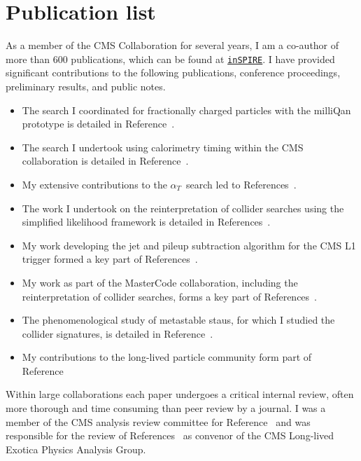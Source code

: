 \documentclass[11pt,a4paper]{article}
\theoremstyle{plain} \numberwithin{equation}{section}
\theoremstyle{definition}
\newcounter{list}
\begin{document}
\section*{Publication list}
As a member of the CMS Collaboration for several years, I am a co-author of more than 600 publications, which can be found at 
\href{http://inspirehep.net/author/profile/M.Citron.2}{\texttt{inSPIRE}}. I have provided significant
  contributions to the following publications, conference proceedings,
  preliminary results, and public notes.
  \begin{itemize}
  \item The search I coordinated for fractionally charged particles with the milliQan prototype is detailed in Reference~\cite{ball2020search}.
  \item The search I undertook using calorimetry timing within the CMS collaboration is detailed in Reference~\cite{2019134876}.
  \item My extensive contributions to the $\alpha_T$~search led to References~\cite{CMS:2016dbr,CMS:2015dbr}.
  \item The work I undertook on the reinterpretation of collider searches using the simplified likelihood framework is detailed in References~\cite{simplifiedLikelihood,Buckley_2019}.
  \item My work developing the jet and pileup subtraction algorithm for the CMS L1 trigger formed a key part of References~\cite{Zabi:2016ljo,Kreis:2015jjr}.
  \item My work as part of the MasterCode collaboration, including the reinterpretation of collider searches, forms a key part of References~\cite{Bagnaschi:2016afc,Bagnaschi:2015eha,Buchmueller:2014yva,Buchmueller:2012hv,deVries:2015hva,Buchmueller:2015uqa}.
  \item The phenomenological study of metastable staus, for which I studied the collider signatures, is detailed in Reference~\cite{Citron:2012fg}.
  
  \item My contributions to the long-lived particle community form part of Reference~\cite{Alimena_2020}
  \end{itemize}

Within large collaborations each paper undergoes a critical internal review, 
often more thorough and time consuming than peer review by a journal. 
I was a member of the CMS analysis review committee for Reference~\cite{PhysRevD.100.112003} 
and was responsible for the review of References~\cite{Sirunyan_2020,mlst_2020} as convenor 
of the CMS Long-lived Exotica Physics Analysis Group.




\end{document}
